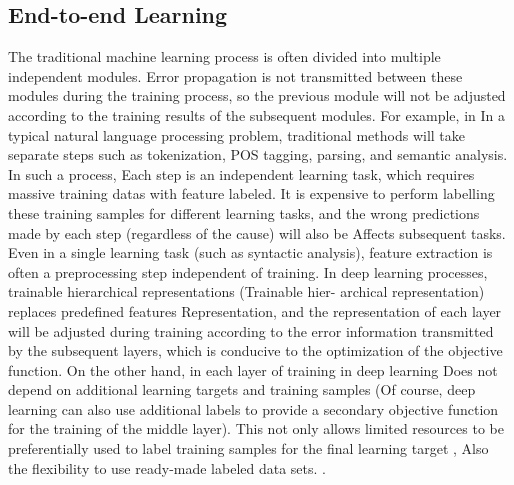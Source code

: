 \documentclass[11pt,en]{elegantpaper}
\begin{document}
\subsection{End-to-end Learning}
The traditional machine learning process is often divided into multiple independent modules. Error propagation is not transmitted between these modules during the training process, so the previous module will not be adjusted according to the training results of the subsequent modules. For example, in In a typical natural language processing problem, traditional methods will take separate steps such as tokenization, POS tagging, parsing, and semantic analysis. In such a process, Each step is an independent learning task, which requires massive training datas with feature labeled. It is expensive to perform labelling these training samples for different learning tasks, and the wrong predictions made by each step (regardless of the cause) will also be Affects subsequent tasks. Even in a single learning task (such as syntactic analysis), feature extraction is often a preprocessing step independent of training. In deep learning processes, trainable hierarchical representations (Trainable hier- archical representation) replaces predefined features Representation, and the representation of each layer will be adjusted during training according to the error information transmitted by the subsequent layers, which is conducive to the optimization of the objective function\cite{31}. On the other hand, in each layer of training in deep learning Does not depend on additional learning targets and training samples (Of course, deep learning can also use additional labels to provide a secondary objective function for the training of the middle layer). This not only allows limited resources to be preferentially used to label training samples for the final learning target , Also the flexibility to use ready-made labeled data sets.
.
\end{document}
